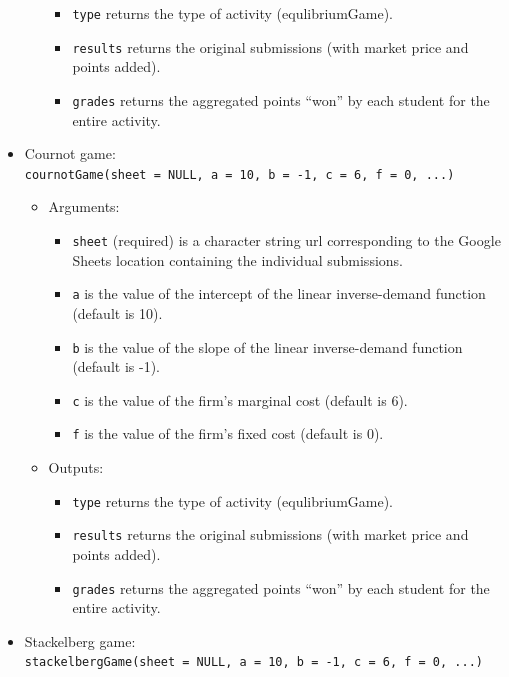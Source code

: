 \documentclass[
]{article}
\providecommand{\tightlist}{%
  \setlength{\itemsep}{0pt}\setlength{\parskip}{0pt}}
\begin{document}
\begin{itemize}
\begin{itemize}
    \begin{itemize}
    \tightlist
    \item
      \texttt{type} returns the type of activity (equlibriumGame).
    \item
      \texttt{results} returns the original submissions (with market
      price and points added).
    \item
      \texttt{grades} returns the aggregated points ``won'' by each
      student for the entire activity.
    \end{itemize}
  \end{itemize}
\item
  Cournot game:
  \texttt{cournotGame(sheet\ =\ NULL,\ a\ =\ 10,\ b\ =\ -1,\ c\ =\ 6,\ f\ =\ 0,\ ...)}

  \begin{itemize}
  \item
    Arguments:

    \begin{itemize}
    \tightlist
    \item
      \texttt{sheet} (required) is a character string url corresponding
      to the Google Sheets location containing the individual
      submissions.
    \item
      \texttt{a} is the value of the intercept of the linear
      inverse-demand function (default is 10).
    \item
      \texttt{b} is the value of the slope of the linear inverse-demand
      function (default is -1).
    \item
      \texttt{c} is the value of the firm's marginal cost (default is
      6).
    \item
      \texttt{f} is the value of the firm's fixed cost (default is 0).
    \end{itemize}
  \item
    Outputs:

    \begin{itemize}
    \tightlist
    \item
      \texttt{type} returns the type of activity (equlibriumGame).
    \item
      \texttt{results} returns the original submissions (with market
      price and points added).
    \item
      \texttt{grades} returns the aggregated points ``won'' by each
      student for the entire activity.
    \end{itemize}
  \end{itemize}
\item
  Stackelberg game:
  \texttt{stackelbergGame(sheet\ =\ NULL,\ a\ =\ 10,\ b\ =\ -1,\ c\ =\ 6,\ f\ =\ 0,\ ...)}


\end{itemize}
\end{document}
